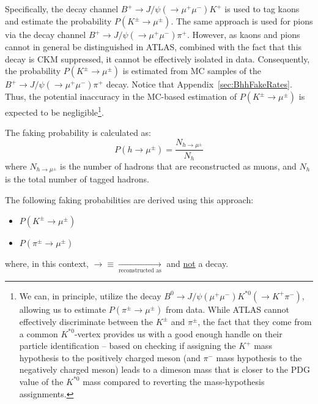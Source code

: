 Specifically, the decay channel $B^+\to J/\psi(\to \mu^+\mu^-)K^+$ is used to tag kaons and estimate the probability \( P(K^\pm \rightarrow \mu^\pm) \).
The same approach is used for pions via the decay channel $B^+\to J/\psi(\to \mu^+\mu^-)\pi^+$. 
However, as kaons and pions cannot in general be distinguished in ATLAS, combined with the fact that this decay is CKM suppressed, it cannot be effectively isolated in data. 
Consequently, the probability \( P(K^\pm \rightarrow \mu^\pm) \) is estimated from MC samples of the $B^+\to J/\psi(\to \mu^+\mu^-)\pi^+$ decay. 
Notice that  Appendix~\ref{sec:BhhFakeRates}. Thus, the potential inaccuracy in the MC-based estimation of \( P(K^\pm \rightarrow \mu^\pm) \) is expected to be negligible\footnote{We can, in principle, utilize the decay \( B^0 \rightarrow J/\psi(\mu^+\mu^-)K^{*0}(\rightarrow K^+\pi^-) \), allowing us to estimate \( P(\pi^\pm \rightarrow \mu^\pm) \) from data. While ATLAS cannot effectively discriminate between the $K^\pm$ and $\pi^\pm$, the fact that they come from a common $K^{\ast 0}$-vertex provides us with a good enough handle on their particle identification -- based on checking if assigning the $K^+$ mass hypothesis to the positively charged meson (and $\pi^-$ mass hypothesis to the negatively charged meson) leads to a dimeson mass that is closer to the PDG value of the $K^{\ast 0}$ mass compared to reverting the mass-hypothesis assignments.}.

The faking probability is calculated as:
\[
P(h \rightarrow \mu^\pm) = \frac{N_{h \rightarrow \mu^\pm}}{N_h}
\]
where \( N_{h \rightarrow \mu^\pm} \) is the number of hadrons that are reconstructed as muons, and \( N_h \) is the total number of tagged hadrons.

The following faking probabilities are derived using this approach: 
\begin{itemize}
    \item $P(K^\pm \to \mu^\pm)$
    \item $P(\pi^\pm \to \mu^\pm)$
\end{itemize}

where, in this context, $\rightarrow\equiv \xrightarrow[\text{reconstructed as}]{}$ and \underline{not} a decay. %

